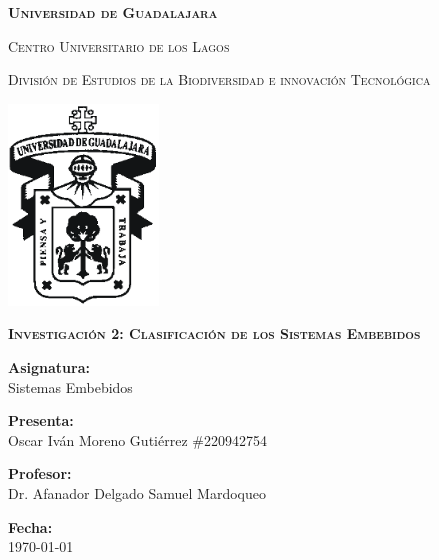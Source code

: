 \documentclass[12pt]{report}
\begin{document}
\setlength{\hoffset}{27 pt} %
\begin{titlepage}
{\centering
{\scshape\bfseries\fontsize{29.16}{34.992}\selectfont Universidad de Guadalajara \par}
\vspace{0.5cm}
{\scshape\Large Centro Universitario de los Lagos \par}
\vspace{1cm}
{\scshape\Large División de Estudios de la Biodiversidad e innovación Tecnológica \par}
\vspace{1cm}
{\graphicspath{{imagenes/Portada}} %
\includegraphics[width=0.3\textwidth]{image.png}\par}
\vspace{1cm}
{\scshape\large\bfseries Investigación 2: Clasificación de los Sistemas Embebidos\par}
\vspace{1.5cm}
{\large \textbf{Asignatura:} \\Sistemas Embebidos\par}
\vfill
{\large \textbf{Presenta:} \\Oscar Iván Moreno Gutiérrez \#220942754\par}
\vfill
{\large \textbf{Profesor:} \\Dr. Afanador Delgado Samuel Mardoqueo \par}
\vfill
\vfill
\begin{flushright}
  {\normalsize \textbf {Fecha:} \\ \today}
\end{flushright}
\vfill}
{\large  \par}
\end{titlepage}

\tableofcontents
\newpage
\end{document}
